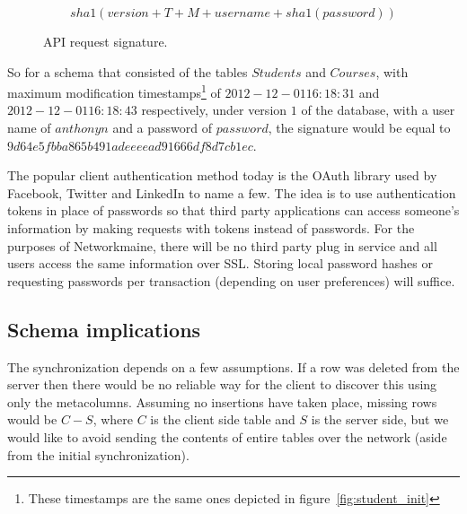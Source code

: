 \documentclass[journal]{IEEEtran}
\begin{document}
\begin{figure}[h!]
\[
sha1(version + T + M + username + sha1(password))
\]
\caption{API request signature.}
\label{fig:signature}
\end{figure}

So for a schema that consisted of the tables $Students$ and $Courses$, with maximum modification timestamps\footnote{These timestamps are the same ones depicted in figure~\ref{fig:student_init}} of $2012-12-01 16:18:31$ and $2012-12-01 16:18:43$ respectively, under version $1$ of the database, with a user name of $anthonyn$ and a password of $password$, the signature would be equal to \hbox{$9d64e5fbba865b491adeeeead91666df8d7cb1ec$}.


The popular client authentication method today is the OAuth library\cite{_oauth_????} used by Facebook, Twitter and LinkedIn to name a few. The idea is to use authentication tokens in place of passwords so that third party applications can access someone's information by making requests with tokens instead of passwords. For the purposes of Networkmaine, there will be no third party plug in service and all users access the same information over SSL. Storing local password hashes or requesting passwords per transaction (depending on user preferences) will suffice.







\subsection{Schema implications}
\label{sec:schema}

The synchronization depends on a few assumptions. If a row was deleted from the server then there would be no reliable way for the client to discover this using only the metacolumns. Assuming no insertions have taken place, missing rows would be $C - S$, where $C$ is the client side table and $S$ is the server side, but we would like to avoid sending the contents of entire tables over the network (aside from the initial synchronization). 
\end{document}
